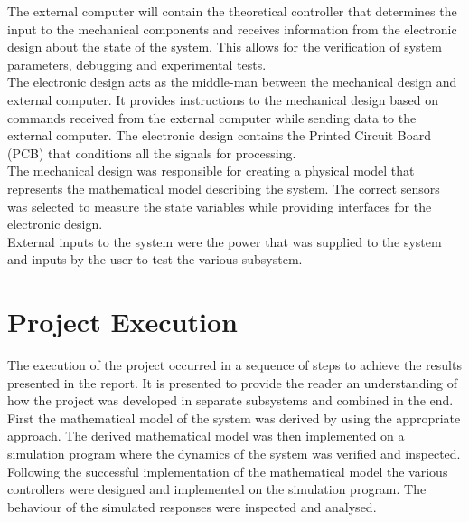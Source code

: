 The external computer will contain the theoretical controller that determines the input to the mechanical components and receives information from the electronic design about the state of the system. This allows for the verification of system parameters, debugging and experimental tests.\\

The electronic design acts as the middle-man between the mechanical design and external computer. It provides instructions to the mechanical design based on commands received from the external computer while sending data to the external computer. The electronic design contains the Printed Circuit Board (PCB) that conditions all the signals for processing.\\

The mechanical design was responsible for creating a physical model that represents the mathematical model describing the system. The correct sensors was selected to measure the state variables while providing interfaces for the electronic design.\\

External inputs to the system were the power that was supplied to the system and inputs by the user to test the various subsystem.

\section{Project Execution}

The execution of the project occurred in a sequence of steps to achieve the results presented in the report. It is presented to provide the reader an understanding of how the project was developed in separate subsystems and combined in the end.\\
 
First the mathematical model of the system was derived by using the appropriate approach. The derived mathematical model was then implemented on a simulation program where the dynamics of the system was verified and inspected.\\

Following the successful implementation of the mathematical model the various controllers were designed and implemented on the simulation program. The behaviour of the simulated responses were inspected and analysed.\\

